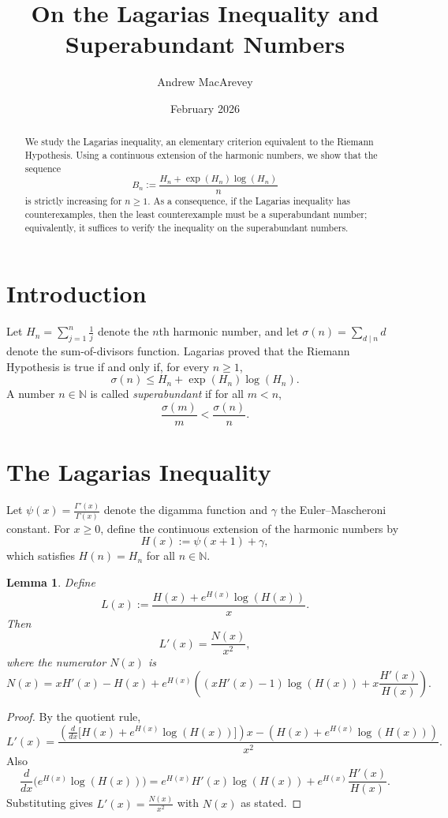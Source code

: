 \documentclass{article}
\title{On the Lagarias Inequality and Superabundant Numbers}
\author{Andrew MacArevey}
\date{February 2026}
\newtheorem{lemma}{Lemma}[section]
\begin{document}
\maketitle

\begin{abstract}
We study the Lagarias inequality, an elementary criterion equivalent to the Riemann Hypothesis. Using a continuous extension of the harmonic numbers, we show that the sequence
\[
B_n:=\frac{H_n+\exp(H_n)\log(H_n)}{n}
\]
is strictly increasing for $n\ge 1$. As a consequence, if the Lagarias inequality has counterexamples, then the least counterexample must be a superabundant number; equivalently, it suffices to verify the inequality on the superabundant numbers.
\end{abstract}

\section{Introduction}

Let $H_n=\sum_{j=1}^n\frac{1}{j}$ denote the $n$th harmonic number, and let $\sigma(n)=\sum_{d\mid n} d$ denote the sum-of-divisors function.
Lagarias \cite{Lagarias2002} proved that the Riemann Hypothesis is true if and only if, for every $n\ge 1$,
\begin{equation}\label{eq:Lagarias}
\sigma(n)\le H_n+\exp(H_n)\log(H_n).
\end{equation}
A number $n\in\mathbb{N}$ is called \emph{superabundant} if for all $m<n$,
\[
\frac{\sigma(m)}{m}<\frac{\sigma(n)}{n}.
\]

\section{The Lagarias Inequality}

Let $\psi(x)=\frac{\Gamma'(x)}{\Gamma(x)}$ denote the digamma function and $\gamma$ the Euler--Mascheroni constant. For $x\geq0$, define the continuous extension of the harmonic numbers by
\[
H(x):=\psi(x+1)+\gamma,
\]
which satisfies $H(n)=H_n$ for all $n\in\mathbb{N}$.

\begin{lemma}\label{lem:derivative_formula}
Define
\[
L(x):=\frac{H(x)+e^{H(x)}\log(H(x))}{x}.
\]
Then
\[
L'(x)=\frac{N(x)}{x^2},
\]
where the numerator $N(x)$ is
\[
N(x)=xH'(x)-H(x)+e^{H(x)}\left((xH'(x)-1)\log(H(x))+x\frac{H'(x)}{H(x)}\right).
\]
\end{lemma}

\begin{proof}
By the quotient rule,
\[
L'(x)=\frac{\left(\frac{d}{dx}\bigl[H(x)+e^{H(x)}\log(H(x))\bigr]\right)x-\left(H(x)+e^{H(x)}\log(H(x))\right)}{x^2}.
\]
Also
\[
\frac{d}{dx}\bigl(e^{H(x)}\log(H(x))\bigr)
=e^{H(x)}H'(x)\log(H(x))+e^{H(x)}\frac{H'(x)}{H(x)}.
\]
Substituting gives $L'(x)=\frac{N(x)}{x^2}$ with $N(x)$ as stated.
\end{proof}
\end{document}
